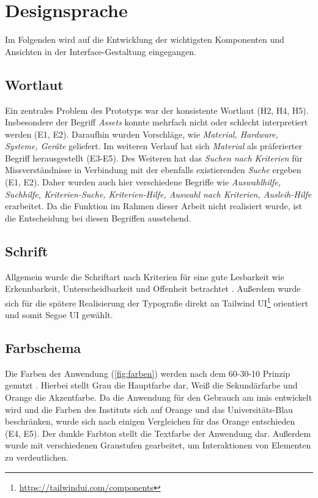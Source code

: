 \section{Designsprache}

Im Folgenden wird auf die Entwicklung der wichtigsten Komponenten und Ansichten
in der Interface-Gestaltung eingegangen.

\subsection{Wortlaut}
Ein zentrales Problem des Prototyps war der konsistente Wortlaut (H2, H4, H5).
Insbesondere der Begriff \textit{Assets} konnte mehrfach nicht oder schlecht
interpretiert werden (E1, E2). Daraufhin wurden Vorschläge, wie
\textit{Material, Hardware, Systeme, Geräte} geliefert. Im weiteren Verlauf hat sich
\textit{Material} als präferierter Begriff herausgestellt (E3-E5). Des Weiteren
hat das \textit{Suchen nach Kriterien} für Missverständnisse in Verbindung mit
der ebenfalls existierenden \textit{Suche} ergeben (E1, E2). Daher wurden auch
hier verschiedene Begriffe wie
\textit{Auswahlhilfe, Suchhilfe, Kriterien-Suche, Kriterien-Hilfe, Auswahl nach Kriterien, Ausleih-Hilfe}
erarbeitet. Da die Funktion im Rahmen dieser Arbeit nicht realisiert wurde, ist die Entscheidung bei
diesen Begriffen ausstehend.

\subsection{Schrift}
Allgemein wurde die Schriftart nach Kriterien für eine gute Lesbarkeit wie
Erkennbarkeit, Unterscheidbarkeit und Offenheit betrachtet
\cite{kommunikationsdesign_leserlichinfo}. Außerdem wurde sich für die spätere
Realisierung der Typografie direkt an Tailwind
UI\footnote{\url{https://tailwindui.com/components}} orientiert und somit Segoe
UI gewählt.

\subsection{Farbschema}
Die Farben der Anwendung (\ref{fig:farben}) werden nach dem 60-30-10 Prinzip genutzt
\cite{experience_using}. Hierbei stellt Grau die Hauptfarbe dar, Weiß die Sekundärfarbe und Orange
die Akzentfarbe. Da die Anwendung für den Gebrauch am \ac{imis} entwickelt wird und die Farben des
Instituts sich auf Orange und das Universitäts-Blau beschränken, wurde sich nach einigen Vergleichen
für das Orange entschieden (E4, E5). Der dunkle Farbton stellt die Textfarbe der Anwendung dar. Außerdem
wurde mit verschiedenen Graustufen gearbeitet, um Interaktionen von Elementen zu verdeutlichen.

